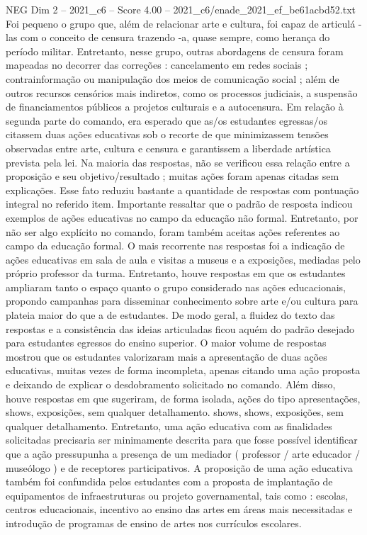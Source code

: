\begin{textsample}{NEG Dim 2 – 2021\_c6 – Score 4.00 – 2021\_c6/enade\_2021\_ef\_be61acbd52.txt}
Foi pequeno o grupo que, além de relacionar arte e cultura, foi capaz de articulá -las com o conceito de censura trazendo -a, quase sempre, como herança do período militar.
Entretanto, nesse grupo, outras abordagens de censura foram mapeadas no decorrer das correções : cancelamento em redes sociais ; contrainformação ou manipulação dos meios de comunicação social ; além de outros recursos censórios mais indiretos, como os processos judiciais, a suspensão de financiamentos públicos a projetos culturais e a autocensura.
Em relação à segunda parte do comando, era esperado que as/os estudantes egressas/os citassem duas ações educativas sob o recorte de que minimizassem tensões observadas entre arte, cultura e censura e garantissem a liberdade artística prevista pela lei.
Na maioria das respostas, não se verificou essa relação entre a proposição e seu objetivo/resultado ; muitas ações foram apenas citadas sem explicações.
Esse fato reduziu bastante a quantidade de respostas com pontuação integral no referido item.
Importante ressaltar que o padrão de resposta indicou exemplos de ações educativas no campo da educação não formal.
Entretanto, por não ser algo explícito no comando, foram também aceitas ações referentes ao campo da educação formal.
O mais recorrente nas respostas foi a indicação de ações educativas em sala de aula e visitas a museus e a exposições, mediadas pelo próprio professor da turma.
Entretanto, houve respostas em que os estudantes ampliaram tanto o espaço quanto o grupo considerado nas ações educacionais, propondo campanhas para disseminar conhecimento sobre arte e/ou cultura para plateia maior do que a de estudantes.
De modo geral, a fluidez do texto das respostas e a consistência das ideias articuladas ficou aquém do padrão desejado para estudantes egressos do ensino superior.
O maior volume de respostas mostrou que os estudantes valorizaram mais a apresentação de duas ações educativas, muitas vezes de forma incompleta, apenas citando uma ação proposta e deixando de explicar o desdobramento solicitado no comando.
Além disso, houve respostas em que sugeriram, de forma isolada, ações do tipo apresentações, shows, exposições, sem qualquer detalhamento. shows, shows, exposições, sem qualquer detalhamento.
Entretanto, uma ação educativa com as finalidades solicitadas precisaria ser minimamente descrita para que fosse possível identificar que a ação pressupunha a presença de um mediador ( professor / arte educador / museólogo ) e de receptores participativos.
A proposição de uma ação educativa também foi confundida pelos estudantes com a proposta de implantação de equipamentos de infraestruturas ou projeto governamental, tais como : escolas, centros educacionais, incentivo ao ensino das artes em áreas mais necessitadas e introdução de programas de ensino de artes nos currículos escolares.

\end{textsample}
